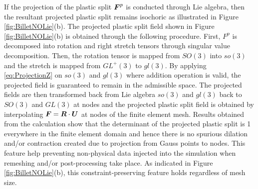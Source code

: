 \documentclass[12pt]{article}
\begin{document}
If the projection of the plastic split ${\boldsymbol{F}}^{p}$ is conducted through
Lie algebra, then the resultant projected plastic split remains
isochoric as illustrated in Figure \ref{fig:BilletNOLie}(b).  The
projected plastic split field shown in Figure \ref{fig:BilletNOLie}(b)
is obtained through the following procedure.  First, $F^{p}$ is
decomposed into rotation and right stretch tensors through singular
value decomposition.  Then, the rotation tensor is mapped from $SO(3)$
into $so(3)$ and the stretch is mapped from $GL^{+}(3)$ to $gl(3)$.
By applying \eqref{eq:ProjectionZ} on $so(3)$ and $gl(3)$ where
addition operation is valid, the projected field is guaranteed to
remain in the admissible space. The projected fields are then
transformed back from Lie algebra $so(3)$ and $gl(3)$ back to $SO(3)$
and $GL(3)$ at nodes and the projected plastic split field is
obtained by interpolating ${\boldsymbol{F}} = {\boldsymbol{R}} \cdot {\boldsymbol{U}}$ at nodes of the finite
element mesh. Results obtained from the calculation show that the
determinant of the projected plastic split is 1 everywhere in the
finite element domain and hence there is no spurious dilation and/or
contraction created due to projection from Gauss points to nodes. This
feature help preventing non-physical data injected into the simulation
when remeshing and/or post-processing take place. As indicated in
Figure \ref{fig:BilletNOLie}(b), this constraint-preserving feature
holds regardless of mesh size.
\end{document}
